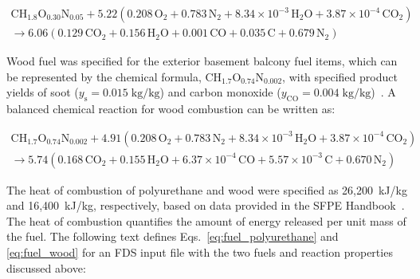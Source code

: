 \documentclass[12pt,oneside]{book}
\renewcommand{\C}{\mbox{C}}
\renewcommand{\H}{\mbox{H}}
\renewcommand{\O}{\mbox{O}}
\newcommand{\N}{\mbox{N}}
\begin{document}
\begin{multline}
\C\H_{1.8}\O_{0.30}\N_{0.05} + 5.22(0.208\,\O_{2} + 0.783\,\N_{2} + 8.34 \times 10^{-3}\,\H_{2}\O + 3.87 \times 10^{-4}\,\C\O_{2}) \\
\rightarrow 6.06(0.129\,\C\O_{2} + 0.156\,\H_{2}\O + 0.001\,\C\O + 0.035\,\C + 0.679\,\N_{2})
\label{eq:fuel_polyurethane}
\end{multline}


\clearpage


Wood fuel was specified for the exterior basement balcony fuel items, which can be represented by the chemical formula, $\C\H_{1.7}\O_{0.74}\N_{0.002}$, with specified product yields of soot ($y_{\mathrm{s}}=0.015 \; \mathrm{kg}/\mathrm{kg}$) and carbon monoxide ($y_{\mathrm{CO}}=0.004 \; \mathrm{kg}/\mathrm{kg}$)~\cite{SFPE:Tewarson}. A balanced chemical reaction for wood combustion can be written as:

\begin{multline}
\C\H_{1.7}\O_{0.74}\N_{0.002} + 4.91(0.208\,\O_{2} + 0.783\,\N_{2} + 8.34 \times 10^{-3}\,\H_{2}\O + 3.87 \times 10^{-4}\,\C\O_{2}) \\
\rightarrow 5.74(0.168\,\C\O_{2} + 0.155\,\H_{2}\O + 6.37 \times 10^{-4}\,\C\O + 5.57 \times 10^{-3}\,\C + 0.670\,\N_{2})
\label{eq:fuel_wood}
\end{multline}

The heat of combustion of polyurethane and wood were specified as 26,200~kJ/kg and 16,400~kJ/kg, respectively, based on data provided in the SFPE Handbook~\cite{SFPE:Tewarson}. The heat of combustion quantifies the amount of energy released per unit mass of the fuel. The following text defines Eqs.~\ref{eq:fuel_polyurethane} and \ref{eq:fuel_wood} for an FDS input file with the two fuels and reaction properties discussed above:
\end{document}
